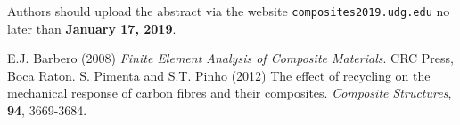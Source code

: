\documentclass[12pt,a4paper]{article}
\begin{document}
Authors should upload the abstract via the website \texttt{composites2019.udg.edu} no later than \textbf{January 17, 2019}. 

\begin{thebibliography}{9}


 E.J. Barbero (2008) \textit{Finite Element Analysis of Composite Materials}. CRC Press, Boca Raton.
 S. Pimenta and S.T. Pinho (2012) The effect of recycling on the mechanical response of carbon fibres and their composites. \textit{Composite Structures}, \textbf{94}, 3669-3684.

\end{thebibliography}
\end{document}
